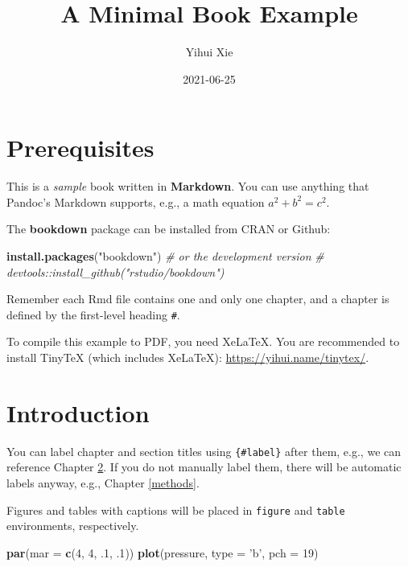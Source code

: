 \documentclass[
]{memoir}
\title{A Minimal Book Example}
\author{Yihui Xie}
\date{2021-06-25}
\newenvironment{Shaded}{\begin{snugshade}}{\end{snugshade}}
\newcommand{\CommentTok}[1]{\textcolor[rgb]{0.56,0.35,0.01}{\textit{#1}}}
\newcommand{\DataTypeTok}[1]{\textcolor[rgb]{0.13,0.29,0.53}{#1}}
\newcommand{\DecValTok}[1]{\textcolor[rgb]{0.00,0.00,0.81}{#1}}
\newcommand{\FloatTok}[1]{\textcolor[rgb]{0.00,0.00,0.81}{#1}}
\newcommand{\KeywordTok}[1]{\textcolor[rgb]{0.13,0.29,0.53}{\textbf{#1}}}
\newcommand{\NormalTok}[1]{#1}
\newcommand{\StringTok}[1]{\textcolor[rgb]{0.31,0.60,0.02}{#1}}
\begin{document}
\maketitle

{
\setcounter{tocdepth}{1}
\tableofcontents
}
\hypertarget{prerequisites}{%
\chapter{Prerequisites}\label{prerequisites}}

This is a \emph{sample} book written in \textbf{Markdown}. You can use anything that Pandoc's Markdown supports, e.g., a math equation \(a^2 + b^2 = c^2\).

The \textbf{bookdown} package can be installed from CRAN or Github:

\begin{Shaded}
\begin{Highlighting}[]
\KeywordTok{install.packages}\NormalTok{(}\StringTok{"bookdown"}\NormalTok{)}
\CommentTok{# or the development version}
\CommentTok{# devtools::install_github("rstudio/bookdown")}
\end{Highlighting}
\end{Shaded}

Remember each Rmd file contains one and only one chapter, and a chapter is defined by the first-level heading \texttt{\#}.

To compile this example to PDF, you need XeLaTeX. You are recommended to install TinyTeX (which includes XeLaTeX): \url{https://yihui.name/tinytex/}.

\hypertarget{intro}{%
\chapter{Introduction}\label{intro}}

You can label chapter and section titles using \texttt{\{\#label\}} after them, e.g., we can reference Chapter \ref{intro}. If you do not manually label them, there will be automatic labels anyway, e.g., Chapter \ref{methods}.

Figures and tables with captions will be placed in \texttt{figure} and \texttt{table} environments, respectively.

\begin{Shaded}
\begin{Highlighting}[]
\KeywordTok{par}\NormalTok{(}\DataTypeTok{mar =} \KeywordTok{c}\NormalTok{(}\DecValTok{4}\NormalTok{, }\DecValTok{4}\NormalTok{, }\FloatTok{.1}\NormalTok{, }\FloatTok{.1}\NormalTok{))}
\KeywordTok{plot}\NormalTok{(pressure, }\DataTypeTok{type =} \StringTok{'b'}\NormalTok{, }\DataTypeTok{pch =} \DecValTok{19}\NormalTok{)}
\end{Highlighting}
\end{Shaded}
\end{document}
